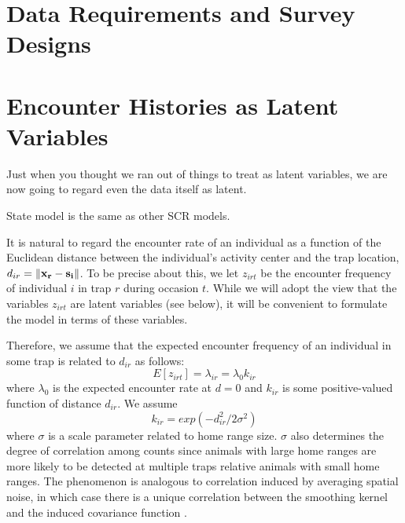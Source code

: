 





\section{Data Requirements and Survey Designs}





\section{Encounter Histories as Latent Variables}

Just when you thought we ran out of things to treat as latent
variables, we are now going to regard even the data itself as latent.


State model is the same as other SCR models.


It is natural to regard the encounter rate of an individual
as a function of the Euclidean distance between the individual's
activity center and the trap location, $d_{ir} = \| {\bf x_r} - {\bf
  s_i} \|$.
To be precise about this, we let $z_{irt}$ be the encounter frequency
of
individual $i$ in trap $r$ during occasion $t$. While we will adopt the view
that  the variables $z_{irt}$ are latent variables (see below), it will
be convenient to formulate the model in terms of these variables.

Therefore, we assume that the expected encounter frequency of an
individual in some trap is related to $d_{ir}$ as follows:
\[
E[z_{irt}] = \lambda_{ir} = \lambda_0 k_{ir}
\]
where $\lambda_0$ is the expected encounter rate at $d=0$ and $k_{ir}$
is some positive-valued
function of distance $d_{ir}$. We assume
\[
k_{ir} = exp(-d_{ir}^2 / 2\sigma^2)
\]
where $\sigma$ is a scale parameter related to home
range size. $\sigma$ also determines the degree of correlation among
counts since animals with large home ranges are more likely to be
detected at multiple traps relative animals with small home ranges.
The phenomenon is analogous to correlation induced by averaging
spatial noise, in which case there is a unique correlation between the
smoothing kernel and the induced covariance function
\citep{higdon:2002}.

